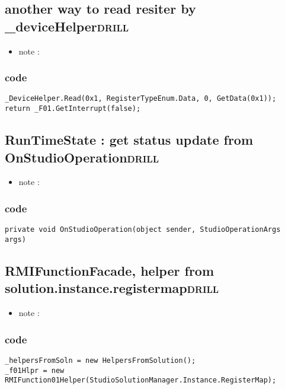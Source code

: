 \documentclass[11pt]{article}
\begin{document}
\subsection{another way to read resiter by \_deviceHelper\hfill{}\textsc{drill}}
\label{sec:org1b41168}
\begin{itemize}
\item note :
\end{itemize}
\subsubsection{code}
\label{sec:org23779a7}
\begin{verbatim}
_DeviceHelper.Read(0x1, RegisterTypeEnum.Data, 0, GetData(0x1));
return _F01.GetInterrupt(false);

\end{verbatim}

\subsection{RunTimeState : get status update from OnStudioOperation\hfill{}\textsc{drill}}
\label{sec:org00deafa}
\begin{itemize}
\item note :
\end{itemize}
\subsubsection{code}
\label{sec:orgdc20aa7}
\begin{verbatim}
private void OnStudioOperation(object sender, StudioOperationArgs args)

\end{verbatim}

\subsection{RMIFunctionFacade, helper from solution.instance.registermap\hfill{}\textsc{drill}}
\label{sec:org8fba295}
\begin{itemize}
\item note :
\end{itemize}
\subsubsection{code}
\label{sec:org93e818a}
\begin{verbatim}
_helpersFromSoln = new HelpersFromSolution();
_f01Hlpr = new RMIFunction01Helper(StudioSolutionManager.Instance.RegisterMap);

\end{verbatim}
\end{document}
